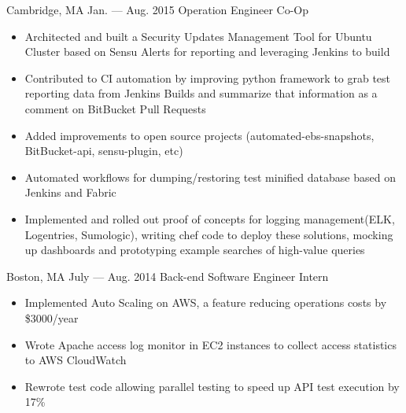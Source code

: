 \documentclass{resume}
\begin{document}
\begin{body}
	{Cambridge, MA}
	{Jan. --- Aug. 2015}
	{Operation Engineer Co-Op}
	\begin{itemize}[noitemsep,topsep=0pt]
		\item Architected and built a Security Updates Management Tool for Ubuntu Cluster based on Sensu Alerts for reporting and leveraging Jenkins to build
		\item Contributed to CI automation by improving python framework to grab test reporting data from Jenkins Builds and summarize that information as a comment on BitBucket Pull Requests
		\item Added improvements to open source projects (automated-ebs-snapshots, BitBucket-api, sensu-plugin, etc)
		\item Automated workflows for dumping/restoring test minified database based on Jenkins and Fabric
		\item Implemented and rolled out proof of concepts for logging management(ELK, Logentries, Sumologic), writing chef code to deploy these solutions, mocking up dashboards and prototyping example searches of high-value queries
	\end{itemize}
\end{body}

\begin{body}
	{Boston, MA}
	{July --- Aug. 2014}
	{Back-end Software Engineer Intern}
	\begin{itemize}[noitemsep,topsep=0pt]
		\item Implemented Auto Scaling on AWS, a feature reducing operations costs by \$3000/year
		\item Wrote Apache access log monitor in EC2 instances to collect access statistics to AWS CloudWatch
		\item Rewrote test code allowing parallel testing to speed up API test execution by 17\%
	\end{itemize}
\end{body}

\smallskip
\end{document}
